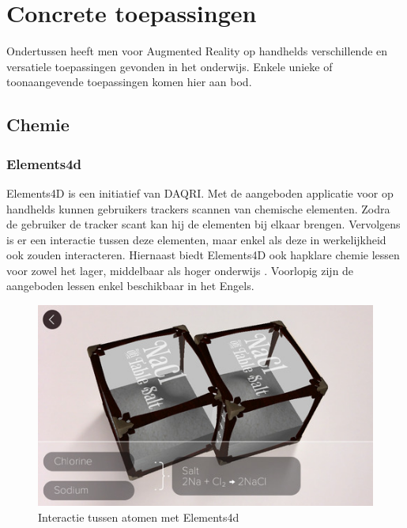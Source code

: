 \documentclass[pdftex,a4paper,12pt,twoside]{report}
\begin{document}
\section{Concrete toepassingen}
Ondertussen heeft men voor Augmented Reality op handhelds verschillende en versatiele toepassingen gevonden in het onderwijs. Enkele unieke of toonaangevende toepassingen komen hier aan bod. \\
  
\subsection{Chemie}
\subsubsection{Elements4d}
Elements4D is een initiatief van DAQRI. Met de aangeboden applicatie voor op handhelds kunnen gebruikers trackers scannen van chemische elementen. Zodra de gebruiker de tracker scant kan hij de elementen bij elkaar brengen. Vervolgens is er een interactie tussen deze elementen, maar enkel als deze in werkelijkheid ook zouden interacteren. Hiernaast biedt Elements4D ook hapklare chemie lessen voor zowel het lager, middelbaar als hoger onderwijs \citep{elements4d}. Voorlopig zijn de aangeboden lessen enkel beschikbaar in het Engels.\\

\begin{figure}[!htr]
\begin{center}
\includegraphics[scale=0.4]{chemie2}
\caption{Interactie tussen atomen met Elements4d \citep{elements4d}}
\end{center}
\end{figure}
\end{document}
